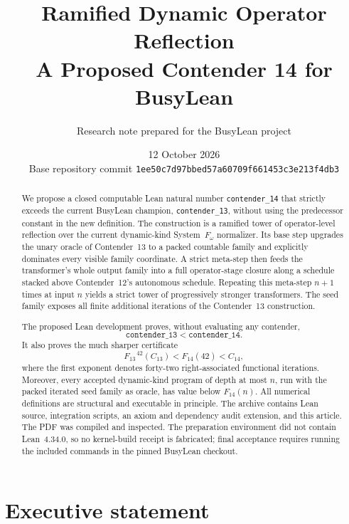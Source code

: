 \documentclass[11pt]{article}
\title{\textbf{Ramified Dynamic Operator Reflection}\\
A Proposed Contender 14 for BusyLean}
\author{Research note prepared for the BusyLean project}
\date{12 October 2026\\\small Base repository commit \texttt{1ee50c7d97bbed57a60709f661453c3e213f4db3}}
\theoremstyle{definition}
\newcommand{\lean}[1]{\texttt{#1}}
\newcommand{\Cthirteen}{\ensuremath{C_{13}}}
\newcommand{\Cfourteen}{\ensuremath{C_{14}}}
\newcommand{\Fthirteen}{\ensuremath{F_{13}}}
\newcommand{\Ffourteen}{\ensuremath{F_{14}}}
\begin{document}
\maketitle

\begin{abstract}
We propose a closed computable Lean natural number \lean{contender\_14} that
strictly exceeds the current BusyLean champion, \lean{contender\_13}, without
using the predecessor constant in the new definition.  The construction is a
ramified tower of operator-level reflection over the current dynamic-kind
System~$F_\omega$ normalizer.  Its base step upgrades the unary oracle of
Contender~13 to a packed countable family and explicitly dominates every
visible family coordinate.  A strict meta-step then feeds the transformer's
whole output family into a full operator-stage closure along a schedule stacked
above Contender~12's autonomous schedule.  Repeating this meta-step $n+1$ times
at input $n$ yields a strict tower of progressively stronger transformers.
The seed family exposes all finite additional iterations of the Contender~13
construction.

The proposed Lean development proves, without evaluating any contender,
\[
  \lean{contender\_13} < \lean{contender\_14}.
\]
It also proves the much sharper certificate
\[
  \Fthirteen^{\,42}(\Cthirteen) < \Ffourteen(42) < \Cfourteen,
\]
where the first exponent denotes forty-two right-associated functional
iterations.  Moreover, every accepted dynamic-kind program of depth at most
$n$, run with the packed iterated seed family as oracle, has value below
$\Ffourteen(n)$.  All numerical definitions are structural and executable in
principle.  The archive contains Lean source, integration scripts, an axiom and
dependency audit extension, and this article.  The PDF was compiled and
inspected.  The preparation environment did not contain Lean~4.34.0, so no
kernel-build receipt is fabricated; final acceptance requires running the
included commands in the pinned BusyLean checkout.
\end{abstract}

\tableofcontents
\newpage

\section{Executive statement}
\end{document}
